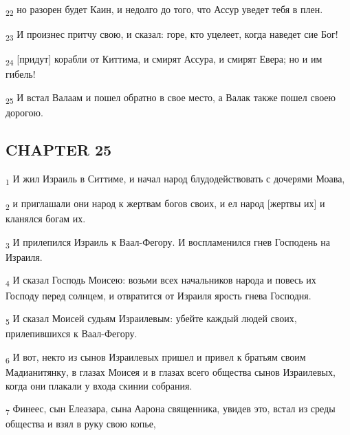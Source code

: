 \begin{tcolorbox}
\textsubscript{22} но разорен будет Каин, и недолго до того, что Ассур уведет тебя в плен.
\end{tcolorbox}
\begin{tcolorbox}
\textsubscript{23} И произнес притчу свою, и сказал: горе, кто уцелеет, когда наведет сие Бог!
\end{tcolorbox}
\begin{tcolorbox}
\textsubscript{24} [придут] корабли от Киттима, и смирят Ассура, и смирят Евера; но и им гибель!
\end{tcolorbox}
\begin{tcolorbox}
\textsubscript{25} И встал Валаам и пошел обратно в свое место, а Валак также пошел своею дорогою.
\end{tcolorbox}
\subsection{CHAPTER 25}
\begin{tcolorbox}
\textsubscript{1} И жил Израиль в Ситтиме, и начал народ блудодействовать с дочерями Моава,
\end{tcolorbox}
\begin{tcolorbox}
\textsubscript{2} и приглашали они народ к жертвам богов своих, и ел народ [жертвы их] и кланялся богам их.
\end{tcolorbox}
\begin{tcolorbox}
\textsubscript{3} И прилепился Израиль к Ваал-Фегору. И воспламенился гнев Господень на Израиля.
\end{tcolorbox}
\begin{tcolorbox}
\textsubscript{4} И сказал Господь Моисею: возьми всех начальников народа и повесь их Господу перед солнцем, и отвратится от Израиля ярость гнева Господня.
\end{tcolorbox}
\begin{tcolorbox}
\textsubscript{5} И сказал Моисей судьям Израилевым: убейте каждый людей своих, прилепившихся к Ваал-Фегору.
\end{tcolorbox}
\begin{tcolorbox}
\textsubscript{6} И вот, некто из сынов Израилевых пришел и привел к братьям своим Мадианитянку, в глазах Моисея и в глазах всего общества сынов Израилевых, когда они плакали у входа скинии собрания.
\end{tcolorbox}
\begin{tcolorbox}
\textsubscript{7} Финеес, сын Елеазара, сына Аарона священника, увидев это, встал из среды общества и взял в руку свою копье,
\end{tcolorbox}
